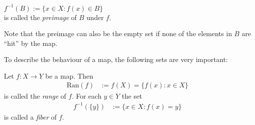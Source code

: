 \begin{Definition}{}
  \begin{minipage}[l]{0.5\textwidth}
    \begin{center}
    $f^{-1}(B):= \lbrace x\in X: f(x) \in B \rbrace$ \\ is called
    the \emph{preimage} of $B$ under $f$.
\end{center}
  \end{minipage}
  \begin{minipage}[r]{0.5\textwidth}
  \flushright
{}
  \end{minipage}
\end{Definition}
%
Note that the preimage can also be the empty set if none of the
elements in $B$ are ``hit'' by the map.

To describe the behaviour of a map,
the following sets are very important:

\begin{Definition}
Let $f: X\rightarrow Y$ be a map. Then
\begin{align*}
 \mathrm{Ran}(f) &:= f(X) = \{ f(x) : x \in X \} 
\end{align*}
is called the \emph{range} of $f$.
For each $y\in Y$ the set
\begin{align*}
 f^{-1}(\{y \}) &:= \{ x \in X : f(x) = y \} 
\end{align*}
is called a \emph{fiber} of $f$.
\end{Definition}
